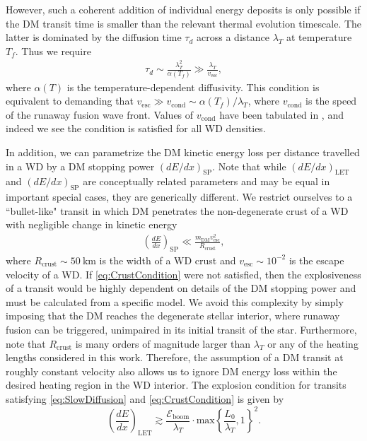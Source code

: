 \documentclass[twocolumn,preprintnumbers,amsmath,amssymb,prd, superscriptaddress]{revtex4} %
\newcommand{\Eboom}{\mathcal{E}_\text{boom}}
\begin{document}
However, such a coherent addition of individual energy deposits is only possible if the DM transit time is smaller than the relevant thermal evolution timescale.
The latter is dominated by the diffusion time $\tau_d$ across a distance $\lambda_T$ at temperature $T_f$.
Thus we require
\begin{align}
\tau_d \sim \frac{\lambda_T^2}{\alpha(T_f)} \gg \frac{\lambda_T}{v_\text{esc}},
\label{eq:SlowDiffusion}
\end{align}
where $\alpha(T)$ is the temperature-dependent diffusivity.
This condition is equivalent to demanding that $v_\text{esc} \gg v_\text{cond} \sim \alpha(T_f) / \lambda_T$, where $v_\text{cond}$ is the speed of the runaway fusion wave front.
Values of $v_\text{cond}$ have been tabulated in \cite{Woosley}, and indeed we see the condition is satisfied for all WD densities.

In addition, we can parametrize the DM kinetic energy loss per distance travelled in a WD by a DM stopping power $(dE/dx)_\text{SP}$.
Note that while $(dE/dx)_\text{LET}$ and $(dE/dx)_\text{SP}$ are conceptually related parameters and may be equal in important special cases, they are generically different.
We restrict ourselves to a ``bullet-like" transit in which DM penetrates the non-degenerate crust of a WD with negligible change in kinetic energy
\begin{align}
\label{eq:CrustCondition}
  \left( \frac{d E}{d x} \right)_\text{SP} \ll
  \frac{m_\text{DM} v^2_\text{esc}}{R_\text{crust}},
\end{align}
where $R_\text{crust} \sim 50 ~\text{km}$ is the width of a WD crust \cite{Chandrasekhar} and $v_\text{esc} \sim 10^{-2}$ is the escape velocity of a WD.
If \eqref{eq:CrustCondition} were not satisfied, then the explosiveness of a transit would be highly dependent on details of the DM stopping power and must be calculated from a specific model.
We avoid this complexity by simply imposing that the DM reaches the degenerate stellar interior, where runaway fusion can be triggered, unimpaired in its initial transit of the star.
Furthermore, note that $R_\text{crust}$ is many orders of magnitude larger than $\lambda_T$ or any of the heating lengths considered in this work.
Therefore, the assumption of a DM transit at roughly constant velocity also allows us to ignore DM energy loss within the desired heating region in the WD interior.
The explosion condition for transits satisfying \eqref{eq:SlowDiffusion} and \eqref{eq:CrustCondition} is given by
\begin{equation}
\label{eq:transitexplosion}
  \left( \frac{d E}{d x} \right)_\text{LET} \gtrsim \frac{\Eboom}{\lambda_T} \cdot \text{max} \left \{\frac{L_0}{\lambda_T}, 1 \right \}^2.
\end{equation}
\end{document}
